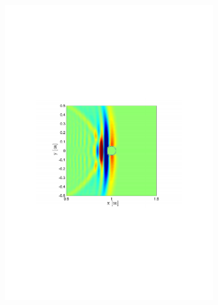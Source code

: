 \begin{figure}
\begin{subfigure}[b]{0.48\textwidth}
                \includegraphics[width=\textwidth]{images/02_Konzeptionierung/sim_wave_3000_2}
        \end{subfigure}
        ~ %
        \begin{subfigure}[b]{0.48\textwidth}
                \centering

\end{subfigure}
\end{figure}
